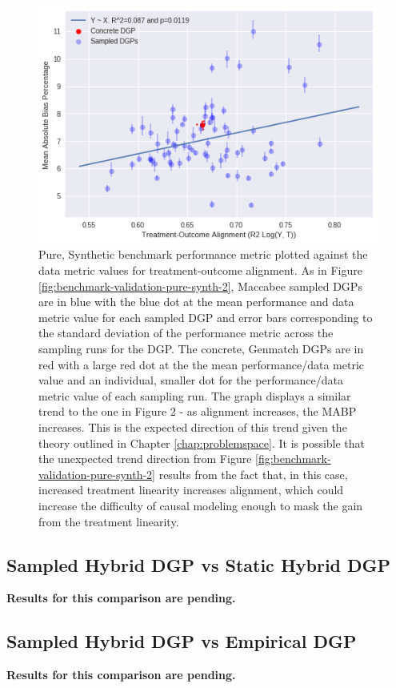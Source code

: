 \documentclass[../main.tex]{subfiles}
\begin{document}
\begin{figure}[ht!]
    \centering
    \includegraphics[width=0.9\linewidth]{figures/ch7-benchmark-pure-synth-3.png}
    \caption{Pure, Synthetic benchmark performance metric plotted against the data metric values for treatment-outcome alignment. As in Figure \ref{fig:benchmark-validation-pure-synth-2}, Maccabee sampled DGPs are in blue with the blue dot at the mean performance and data metric value for each sampled DGP and error bars corresponding to the standard deviation of the performance metric across the sampling runs for the DGP. The concrete, Genmatch DGPs are in red with a large red dot at the the mean performance/data metric value and an individual, smaller dot for the performance/data metric value of each sampling run. The graph displays a similar trend to the one in Figure 2 - as alignment increases, the MABP increases. This is the expected direction of this trend given the theory outlined in Chapter \ref{chap:problemspace}. It is possible that the unexpected trend direction from Figure \ref{fig:benchmark-validation-pure-synth-2} results from the fact that, in this case, increased treatment linearity increases alignment, which could increase the difficulty of causal modeling enough to mask the gain from the treatment linearity.}
    \label{fig:benchmark-validation-pure-synth-3}
\end{figure}
\FloatBarrier

\subsection{Sampled Hybrid DGP vs Static Hybrid DGP}

\textbf{Results for this comparison are pending.}

\subsection{Sampled Hybrid DGP vs Empirical DGP}

\textbf{Results for this comparison are pending.}
\end{document}
